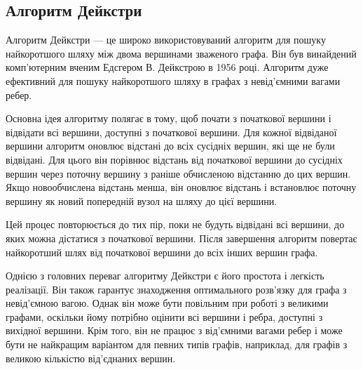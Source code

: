 \subsection{Алгоритм Дейкстри}
\label{subsec:dijkstra-subsection}

Алгоритм Дейкстри --- це широко використовуваний алгоритм для пошуку найкоротшого шляху між двома вершинами зваженого графа. Він був винайдений комп'ютерним вченим Едсгером В. Дейкстрою в 1956 році. Алгоритм дуже ефективний для пошуку найкоротшого шляху в графах з невід'ємними вагами ребер.

Основна ідея алгоритму полягає в тому, щоб почати з початкової вершини і відвідати всі вершини, доступні з початкової вершини. Для кожної відвіданої вершини алгоритм оновлює відстані до всіх сусідніх вершин, які ще не були відвідані. Для цього він порівнює відстань від початкової вершини до сусідніх вершин через поточну вершину з раніше обчисленою відстанню до цих вершин. Якщо новообчислена відстань менша, він оновлює відстань і встановлює поточну вершину як новий попередній вузол на шляху до цієї вершини.

Цей процес повторюється до тих пір, поки не будуть відвідані всі вершини, до яких можна дістатися з початкової вершини. Після завершення алгоритм повертає найкоротший шлях від початкової вершини до всіх інших вершин графа.

Однією з головних переваг алгоритму Дейкстри є його простота і легкість реалізації. Він також гарантує знаходження оптимального розв'язку для графа з невід'ємною вагою. Однак він може бути повільним при роботі з великими графами, оскільки йому потрібно оцінити всі вершини і ребра, доступні з вихідної вершини. Крім того, він не працює з від'ємними вагами ребер і може бути не найкращим варіантом для певних типів графів, наприклад, для графів з великою кількістю від'єднаних вершин.

